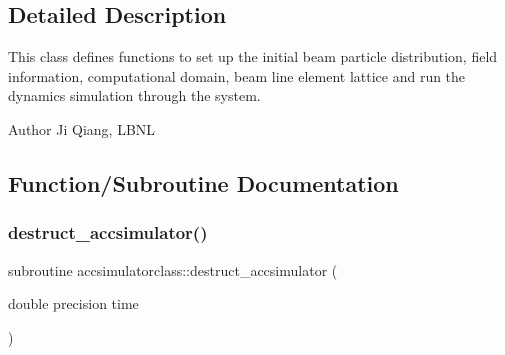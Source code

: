\subsection{Detailed Description}
This class defines functions to set up the initial beam particle distribution, field information, computational domain, beam line element lattice and run the dynamics simulation through the system. 

\begin{DoxyAuthor}{Author}
Ji Qiang, L\+B\+NL 
\end{DoxyAuthor}


\subsection{Function/\+Subroutine Documentation}
\mbox{\label{namespaceaccsimulatorclass_a7bcc6275f447513b2ea5d85d46aade2a}} 
\subsubsection{\texorpdfstring{destruct\_accsimulator()}{destruct\_accsimulator()}}
{\footnotesize\ttfamily subroutine accsimulatorclass\+::destruct\+\_\+accsimulator (\begin{DoxyParamCaption}\item[{double precision}]{time }\end{DoxyParamCaption})}

